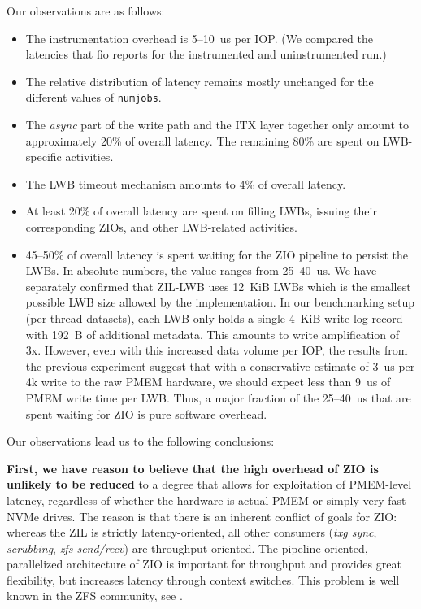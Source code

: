 \documentclass[12pt,a4paper,twoside]{book}
\begin{document}
Our observations are as follows:
\begin{itemize}[noitemsep]
    \item The instrumentation overhead is 5--10~us per IOP. (We compared the latencies that fio reports for the instrumented and uninstrumented run.)
    \item The relative distribution of latency remains mostly unchanged for the different values of \lstinline{numjobs}.
    \item The \textit{async} part of the write path and the ITX layer together only amount to approximately 20\% of overall latency.
        The remaining 80\% are spent on LWB-specific activities.
    \item The LWB timeout mechanism amounts to 4\% of overall latency.
    \item At least 20\% of overall latency are spent on filling LWBs, issuing their corresponding ZIOs, and other LWB-related activities.
    \item 45--50\% of overall latency is spent waiting for the ZIO pipeline to persist the LWBs.
        In absolute numbers, the value ranges from 25--40~us.
        We have separately confirmed that ZIL-LWB uses 12~KiB LWBs which is the smallest possible LWB size allowed by the implementation.
        In our benchmarking setup (per-thread datasets), each LWB only holds a single 4~KiB write log record with 192~B of additional metadata.
        This amounts to write amplification of 3x.
        However, even with this increased data volume per IOP, the results from the previous experiment suggest that with a conservative estimate of 3~us per 4k write to the raw PMEM hardware, we should expect less than 9~us of PMEM write time per LWB.
        Thus, a major fraction of the 25--40~us that are spent waiting for ZIO is pure software overhead.
\end{itemize}

Our observations lead us to the following conclusions:

\textbf{First, we have reason to believe that the high overhead of ZIO is unlikely to be reduced} to a degree that allows for exploitation of PMEM-level latency, regardless of whether the hardware is actual PMEM or simply very fast NVMe drives.
The reason is that there is an inherent conflict of goals for ZIO:
whereas the ZIL is strictly latency-oriented, all other consumers (\textit{txg sync}, \textit{scrubbing}, \textit{zfs send/recv}) are throughput-oriented.
The pipeline-oriented, parallelized architecture of ZIO is important for throughput and provides great flexibility, but increases latency through context switches.
This problem is well known in the ZFS community, see \cite{openzfsZILPerformanceImprovements2020,ZFSSubredditRichardYaoCommentsOnPoorSynchronousWritePerformance,OpenZFSGithubIssueNVMeReadPerformanceZioPipeliningOverheadTimChaseComment}.
\end{document}

